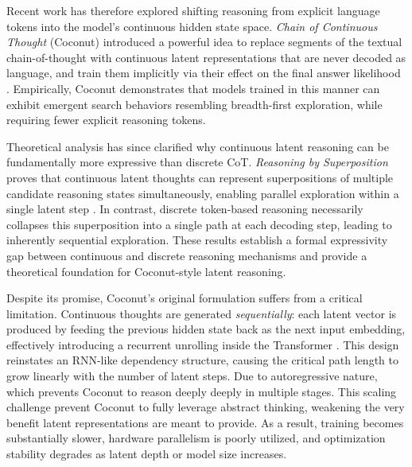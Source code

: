 Recent work has therefore explored shifting reasoning from explicit language tokens into the model’s continuous hidden state space. \emph{Chain of Continuous Thought} (Coconut) introduced a powerful idea to replace segments of the textual chain-of-thought with continuous latent representations that are never decoded as language, and train them implicitly via their effect on the final answer likelihood \cite{hao2024training}. Empirically, Coconut demonstrates that models trained in this manner can exhibit emergent search behaviors resembling breadth-first exploration, while requiring fewer explicit reasoning tokens.

Theoretical analysis has since clarified why continuous latent reasoning can be fundamentally more expressive than discrete CoT. \emph{Reasoning by Superposition} proves that continuous latent thoughts can represent superpositions of multiple candidate reasoning states simultaneously, enabling parallel exploration within a single latent step \cite{zhu2025reasoning}. In contrast, discrete token-based reasoning necessarily collapses this superposition into a single path at each decoding step, leading to inherently sequential exploration. These results establish a formal expressivity gap between continuous and discrete reasoning mechanisms and provide a theoretical foundation for Coconut-style latent reasoning.

Despite its promise, Coconut’s original formulation suffers from a critical limitation. Continuous thoughts are generated \emph{sequentially}: each latent vector is produced by feeding the previous hidden state back as the next input embedding, effectively introducing a recurrent unrolling inside the Transformer \cite{hao2024training}. This design reinstates an RNN-like dependency structure, causing the critical path length to grow linearly with the number of latent steps. Due to autoregressive nature, which prevents Coconut to reason deeply deeply in multiple stages. This scaling challenge prevent Coconut to fully leverage abstract thinking, weakening the very benefit latent representations are meant to provide. As a result, training becomes substantially slower, hardware parallelism is poorly utilized, and optimization stability degrades as latent depth or model size increases.

